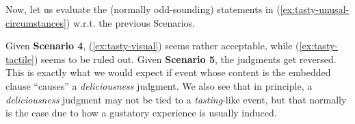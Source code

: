 \documentclass[11pt]{article}
\begin{document}
\begin{center}
\end{center}
\begin{center}
\end{center}
Now, let us evaluate the (normally odd-sounding) statements in (\ref{ex:tasty-unusal-circumstances}) w.r.t. the previous Scenarios.
\begin{exe}
	\ex 
	\begin{xlist}
		\label{ex:tasty-visual}
		\label{ex:tasty-tactile}
	\end{xlist}\label{ex:tasty-unusal-circumstances}
\end{exe}
Given \textbf{Scenario 4}, (\ref{ex:tasty-visual}) seems rather acceptable, while (\ref{ex:tasty-tactile}) seems to be ruled out. Given \textbf{Scenario 5}, the judgments get reversed. This is exactly what we would expect if event whose content is the embedded clause ``causes'' a \textit{deliciousness} judgment. We also see that in principle, a \textit{deliciousness} judgment may not be tied to a \textit{tasting}-like event, but that normally is the case due to how a gustatory experience is usually induced.\\
\end{document}
